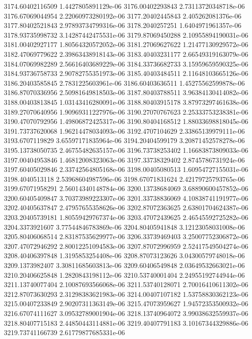 {3174.60402116509 1.4427805891129e-06
3176.00402293843 2.73113720348718e-06
3176.67069044954 2.22060973280192e-06
3177.20402445843 2.405262081376e-06
3177.80402521843 2.97893734799316e-06
3178.2040257251 1.6404971961357e-06
3178.93735998732 3.14287442475531e-06
3179.87069450288 2.10955894190031e-06
3181.00402927177 1.80564320572052e-06
3181.27069627622 1.21477130929572e-06
3182.47069779622 2.39863438918143e-06
3183.40403231177 2.66549319163079e-06
3184.07069982289 2.56616403689229e-06
3184.33736682733 3.15959659590325e-06
3184.93736758733 2.90782755351973e-06
3185.40403484511 2.11648103665126e-06
3186.20403585845 2.7831225603961e-06
3186.60403636511 1.45275562599878e-06
3186.87070336956 2.50981649818503e-06
3187.80403788511 3.96384130414082e-06
3188.00403813845 1.03143416280091e-06
3188.80403915178 3.87973297461638e-06
3189.27070640956 1.90969311227976e-06
3190.27070767623 2.25333753238381e-06
3190.47070792956 1.49806872425317e-06
3190.80404168512 1.88033698818045e-06
3191.73737620068 1.96214478034093e-06
3192.4707104629 2.33865139979111e-06
3193.6707119829 3.65597171835964e-06
3194.20404599179 3.20871452578278e-06
3195.13738050735 2.46755482635157e-06
3196.73738253402 1.16683873809033e-06
3197.00404953846 1.46812008323063e-06
3197.33738329402 2.8745786731924e-06
3197.60405029846 2.33742564805168e-06
3198.00405080513 1.60954727155031e-06
3198.4040513118 2.53968604987596e-06
3198.67071831624 2.42179725793765e-06
3199.67071958291 2.56014340148784e-06
3200.13738684069 3.68890600457852e-06
3200.60405409847 3.70373989223307e-06
3201.33738836069 4.10838741191977e-06
3202.40405637847 2.47957655358626e-06
3202.87072363625 2.63801704624387e-06
3203.20405739181 1.80559429767374e-06
3203.47072439625 2.46545592725282e-06
3204.3373921607 3.77544846783869e-06
3204.80405941848 3.12123058031008e-06
3205.80406068514 2.83187535629977e-06
3206.33739469403 3.25007752306872e-06
3207.47072946292 2.80012251094583e-06
3207.87072996959 2.52417549504274e-06
3208.40406397848 1.3195853254408e-06
3208.87073123626 3.04300579748018e-06
3209.1373982407 3.30811685603813e-06
3209.60406549848 2.03649532663021e-06
3210.20406625848 1.2820843198112e-06
3210.53740001404 2.24955192744944e-06
3211.13740077404 2.10087693566068e-06
3211.53740128071 2.70016410611302e-06
3212.87073630293 2.31298383621983e-06
3214.00407107182 1.53758830362123e-06
3215.00407233849 2.90207311363149e-06
3215.47073959627 1.94572353500932e-06
3216.67074111627 3.09532789001904e-06
3218.13740964072 3.99038632559937e-06
3218.80407715183 2.44850443114881e-06
3219.40407791183 3.10167344329886e-06
3219.73741166739 2.61779877685331e-06
}
